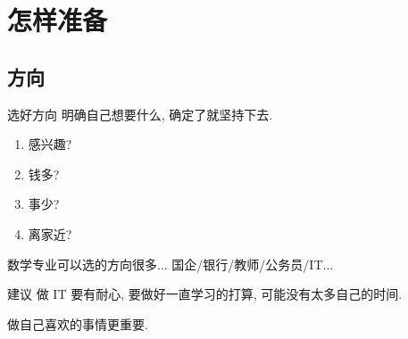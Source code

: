 \documentclass{ctexbeamer}
\begin{document}
\section{怎样准备}


\subsection{方向}
\begin{frame}{选好方向}
	明确自己想要什么, 确定了就坚持下去.
	\begin{enumerate}
		\item 感兴趣?
		\item 钱多?
		\item 事少?
		\item 离家近?
	\end{enumerate}

	数学专业可以选的方向很多... 国企/银行/教师/公务员/IT...

	\begin{exampleblock}{建议}
		做 IT 要有耐心, 要做好一直学习的打算, 可能没有太多自己的时间.

		做自己喜欢的事情更重要.

	\end{exampleblock}
\end{frame}
\end{document}
